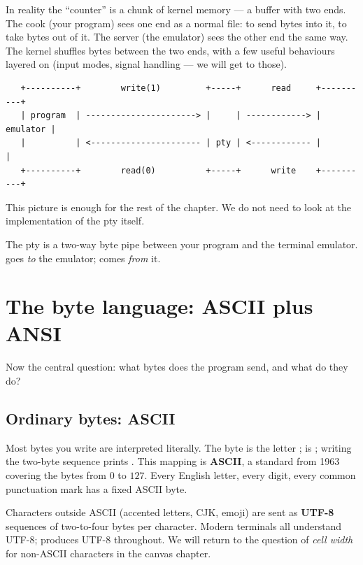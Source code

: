 In reality the ``counter'' is a chunk of kernel memory --- a buffer
with two ends. The cook (your program) sees one end as a normal file:
 to send bytes into it,  to take bytes out of
it. The server (the emulator) sees the other end the same way. The
kernel shuffles bytes between the two ends, with a few useful
behaviours layered on (input modes, signal handling --- we will get to
those).

\begin{center}
\small
\begin{verbatim}
   +----------+        write(1)         +-----+      read     +----------+
   | program  | ----------------------> |     | ------------> | emulator |
   |          | <---------------------- | pty | <------------ |          |
   +----------+        read(0)          +-----+      write    +----------+
\end{verbatim}
\end{center}

This picture is enough for the rest of the chapter. We do not need to
look at the implementation of the pty itself.

\begin{idea}
The pty is a two-way byte pipe between your program and the terminal
emulator.  goes \emph{to} the emulator; 
comes \emph{from} it.
\end{idea}

\section{The byte language: ASCII plus ANSI}

Now the central question: what bytes does the program send, and what
do they do?

\subsection{Ordinary bytes: ASCII}

Most bytes you write are interpreted literally. The byte 
is the letter ;  is ; writing the two-byte
sequence  prints . This mapping is
\textbf{ASCII}, a standard from 1963 covering the bytes from $0$ to
$127$. Every English letter, every digit, every common punctuation
mark has a fixed ASCII byte.

Characters outside ASCII (accented letters, CJK, emoji) are sent as
\textbf{UTF-8} sequences of two-to-four bytes per character. Modern
terminals all understand UTF-8; \maya{} produces UTF-8 throughout. We
will return to the question of \emph{cell width} for non-ASCII
characters in the canvas chapter.

